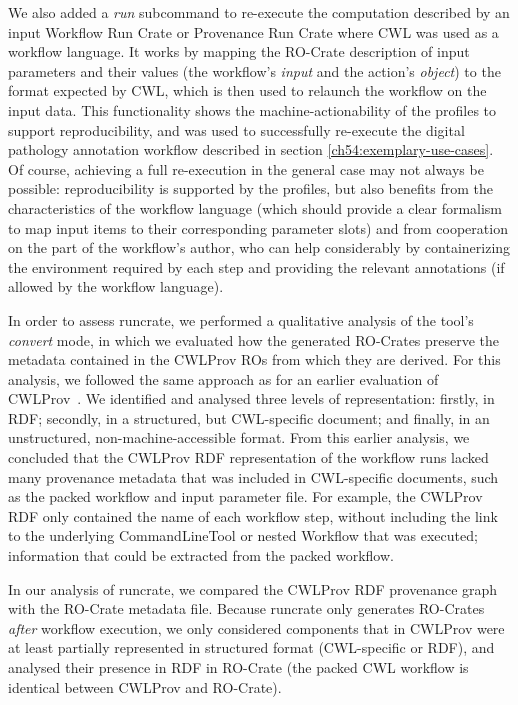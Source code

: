 We also added a \emph{run} subcommand to re-execute the computation described by an input Workflow Run Crate or Provenance Run Crate where CWL was used as a workflow language.
It works by mapping the RO-Crate description of input parameters and their values (the workflow's
\emph{input} and the action's \emph{object}) to the format expected by CWL, which is then used to relaunch the workflow on the input data.
This functionality shows the machine-actionability of the profiles to support reproducibility, and was used to successfully re-execute the digital pathology annotation workflow described in section \vref{ch54:exemplary-use-cases}.
Of course, achieving a full re-execution in the general case may not always be possible: reproducibility is supported by the profiles, but also benefits from the characteristics of the workflow language (which should provide a clear formalism to map input items to their corresponding parameter slots) and from cooperation on the part of the workflow's author, who can help considerably by containerizing the environment required by each step and providing the relevant annotations (if allowed by the workflow language).

In order to assess runcrate, we performed a qualitative analysis of the tool's \emph{convert} mode, in which we evaluated how the generated RO-Crates preserve the metadata contained in the CWLProv ROs from which they are derived.
For this analysis, we followed the same approach as for an earlier evaluation of CWLProv~\cite{De Wit 2022}.
We identified and analysed three levels of representation:
firstly, in RDF; secondly, in a structured, but CWL-specific document;
and finally, in an unstructured, non-machine-accessible format.
From this earlier analysis, we concluded that the CWLProv RDF representation of the workflow runs lacked many provenance metadata that was included in CWL-specific documents, such as the packed workflow and input parameter file.
For example, the CWLProv RDF only contained the name of each workflow step, without including the link to the underlying CommandLineTool or nested Workflow that was executed; information that could be extracted from the packed workflow.

In our analysis of runcrate, we compared the CWLProv RDF provenance graph with the RO-Crate metadata file.
Because runcrate only generates RO-Crates \emph{after} workflow execution, we only considered components that in CWLProv were at least partially represented in structured format (CWL-specific or RDF), and analysed their presence in RDF in RO-Crate (the packed CWL workflow is identical between CWLProv and RO-Crate).

